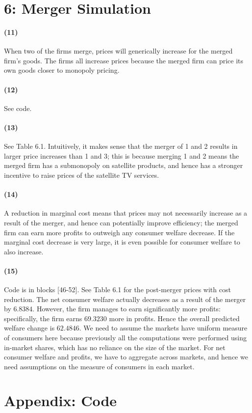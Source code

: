 \documentclass[10pt,letter]{article}
\begin{document}




\clearpage

\section*{6: Merger Simulation}
\paragraph{(11)} When two of the firms merge, prices will generically increase for the merged firm's goods. The firms all increase prices because the merged firm can price its own goods closer to monopoly pricing.
\paragraph{(12)} See code.
\paragraph{(13)} See Table 6.1. Intuitively, it makes sense that the merger of 1 and 2 results in larger price increases than 1 and 3; this is because merging 1 and 2 means the merged firm has a submonopoly on satellite products, and hence has a stronger incentive to raise prices of the satellite TV services.
\paragraph{(14)} A reduction in marginal cost means that prices may not necessarily increase as a result of the merger, and hence can potentially improve efficiency; the merged firm can earn more profits to outweigh any consumer welfare decrease. If the marginal cost decrease is very large, it is even possible for consumer welfare to also increase.
\paragraph{(15)} Code is in blocks [46-52]. See Table 6.1 for the post-merger prices with cost reduction. The net consumer welfare actually decreases as a result of the merger by $6.8384$. However, the firm manages to earn significantly more profits: specifically, the firm earns $69.3230$ more in profits. Hence the overall predicted welfare change is $62.4846$. We need to assume the markets have uniform measure of consumers here because previously all the computations were performed using in-market shares, which has no reliance on the size of the market. For net consumer welfare and profits, we have to aggregate across markets, and hence we need assumptions on the measure of consumers in each market.
\clearpage


\clearpage

\section*{Appendix: Code}

\end{document}
